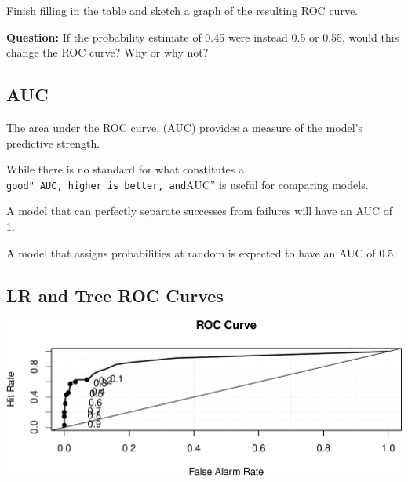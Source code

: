 \documentclass[
  letterpaper,
  DIV=11,
  numbers=noendperiod]{scrreprt}
\newenvironment{Shaded}{\begin{snugshade}}{\end{snugshade}}
\newcommand{\AttributeTok}[1]{\textcolor[rgb]{0.40,0.45,0.13}{#1}}
\newcommand{\FunctionTok}[1]{\textcolor[rgb]{0.28,0.35,0.67}{#1}}
\newcommand{\NormalTok}[1]{\textcolor[rgb]{0.00,0.23,0.31}{#1}}
\newcommand{\SpecialCharTok}[1]{\textcolor[rgb]{0.37,0.37,0.37}{#1}}
\begin{document}
Finish filling in the table and sketch a graph of the resulting ROC
curve.

\textbf{Question:} If the probability estimate of 0.45 were instead 0.5
or 0.55, would this change the ROC curve? Why or why not?

\subsection{AUC}\label{auc}

The area under the ROC curve, (AUC) provides a measure of the model's
predictive strength.

While there is no standard for what constitutes a
\texttt{good"\ AUC,\ higher\ is\ better,\ and}AUC'' is useful for
comparing models.

A model that can perfectly separate successes from failures will have an
AUC of 1.

A model that assigns probabilities at random is expected to have an AUC
of 0.5.

\subsection{LR and Tree ROC Curves}\label{lr-and-tree-roc-curves}

\begin{Shaded}
\end{Shaded}

\includegraphics{Ch7_files/figure-pdf/unnamed-chunk-112-1.pdf}

\begin{Shaded}
\end{Shaded}
\end{document}
